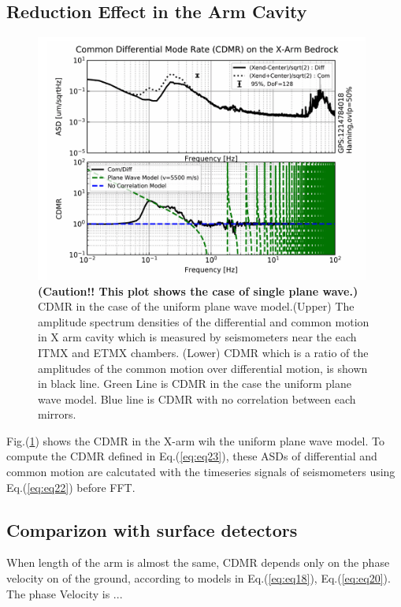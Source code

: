\documentclass[a4paper,12pt]{book}
\begin{document}
\subsection{Reduction Effect in the Arm Cavity}

\begin{figure}[H]
  \begin{center}
    \includegraphics[width=11.0cm]{./img_cdmr_xarm.png}
  \end{center}
  \caption{\textbf{(Caution!! This plot shows the case of single plane wave.)} CDMR in the case of the uniform plane wave model.(Upper) The amplitude spectrum densities of the differential and common motion in X arm cavity which is measured by seismometers near the each ITMX and ETMX chambers. (Lower) CDMR which is a ratio of the amplitudes of the common motion over differential motion, is shown in black line. Green Line is CDMR in the case the uniform plane wave model. Blue line is CDMR with no correlation between each mirrors.}\label{img:img_cdmr_xarm}
\end{figure}

Fig.(\ref{img:img_cdmr_xarm}) shows the CDMR in the X-arm wih the uniform plane wave model. To compute the CDMR defined in Eq.(\ref{eq:eq23}), these ASDs of differential and common motion are calcutated with the timeseries signals of seismometers using Eq.(\ref{eq:eq22}) before FFT. 





\subsection{Comparizon with surface detectors}
When length of the arm is almost the same, CDMR depends only on the phase velocity on of the ground, according to models in Eq.(\ref{eq:eq18}), Eq.(\ref{eq:eq20}). The phase Velocity is ...
\end{document}
